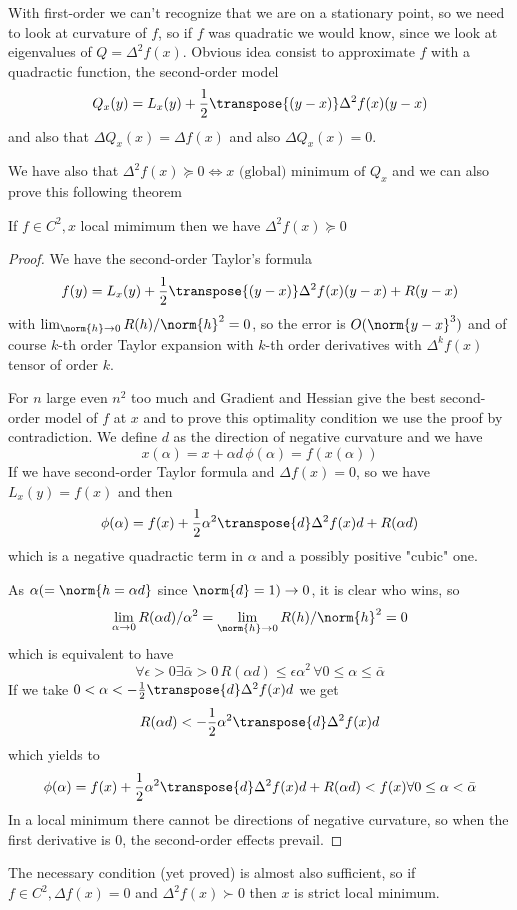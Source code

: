With first-order we can't recognize that we are on a stationary point, so we need to look at 
curvature of $f$, so if $f$ was quadratic we would know, since we look at eigenvalues of 
$Q = \Delta^2 f(x)$.\newline
Obvious idea consist to approximate $f$ with a quadractic function, the second-order model
\[ Q_x(y) = L_x(y) + \frac{1}{2}\transpose{(y - x)}\Delta^2 f(x)(y - x) \]
and also that $\Delta Q_x(x) = \Delta f(x)$ and also $\Delta Q_x(x) = 0$.

We have also that $\Delta^2 f(x) \succeq 0 \iff x \text{ (global) minimum of } Q_x$ and we can
also prove this following theorem
\begin{thm}
    If $f \in C^2, x$ local mimimum then we have $\Delta^2 f(x) \succeq 0$
\end{thm}
\begin{proof}
    We have the second-order Taylor's formula
    \[ f(y) = L_x(y) + \frac{1}{2}\transpose{(y-x)}\Delta^2 f(x) (y - x) + R(y - x) \]
    with $\lim_{\norm{h} \to 0} R(h) / \norm{h}^2 = 0$, so the error is $O(\norm{y-x}^3)$ and
    of course $k$-th order Taylor expansion with $k$-th order derivatives with $\Delta^k f(x)$ 
    tensor of order $k$.

    For $n$ large even $n^2$ too much and Gradient and Hessian give the best second-order model 
    of $f$ at $x$ and to prove this optimality condition we use the proof by contradiction.\newline
    We define $d$ as the direction of negative curvature and we have 
    \[ x(\alpha) = x + \alpha d \, \phi(\alpha) = f(x(\alpha)) \]
    If we have second-order Taylor formula and $\Delta f(x) = 0$, so we have $L_x(y) = f(x)$ and then
    \[ \phi(\alpha) = f(x) + \frac{1}{2}\alpha^2 \transpose{d} \Delta^2 f(x) d + R(\alpha d) \]
    which is a negative quadractic term in $\alpha$ and a possibly positive "cubic" one.

    As $\alpha (= \norm{h = \alpha d}$ since $\norm{d} = 1) \to 0$, it is clear who wins, so
    \[ \lim_{\alpha \to 0} R(\alpha d) / \alpha^2 = \lim_{\norm{h} \to 0} R(h) / \norm{h}^2 = 0 \]
    which is equivalent to have
    \[ \forall \epsilon > 0 \exists \bar{\alpha} > 0 \, R(\alpha d) \leq \epsilon \alpha^2 \,
	                                                \forall 0 \leq \alpha \leq \bar{\alpha} \]
    If we take $0 < \alpha < -\frac{1}{2}\transpose{d}\Delta^2 f(x) d$ we get 
    \[ R(\alpha d) < -\frac{1}{2}\alpha^2\transpose{d}\Delta^2 f(x) d \]
    which yields to
    \[ \phi(\alpha) = f(x) + \frac{1}{2} \alpha^2 \transpose{d} \Delta^2 f(x) d + R(\alpha d) < f(x)
	\forall 0 \leq \alpha < \bar{\alpha} \]
    In a local minimum there cannot be directions of negative curvature, so when the first derivative
    is $0$, the second-order effects prevail.
\end{proof}
The necessary condition (yet proved) is almost also sufficient, so if $f \in C^2, \Delta f(x) = 0$ and
$\Delta^2 f(x) \succ 0$ then $x$ is strict local minimum.

